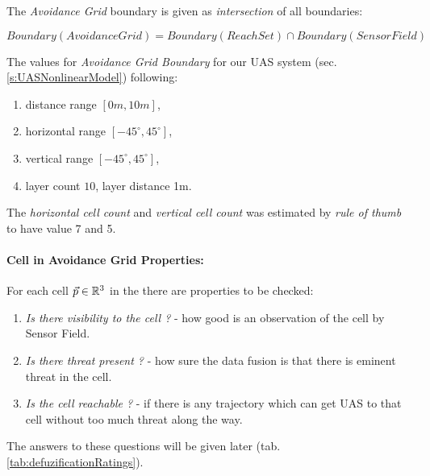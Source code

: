 \noindent The \emph{Avoidance Grid} boundary is given as \emph{intersection} of all boundaries:

\begin{equation}
    Boundary(Avoidance Grid) =  Boundary(Reach Set) \cap Boundary(Sensor Field)
\end{equation}

\noindent The values for \emph{Avoidance Grid Boundary} for our UAS system (sec. \ref{s:UASNonlinearModel}) following:
\begin{enumerate}
    \item distance range $[0m,10m]$,
    \item horizontal range $[-45^\circ,45^\circ]$,
    \item vertical range $[-45^\circ,45^\circ]$,
    \item layer count $10$, layer distance 1m.
\end{enumerate}

The \emph{horizontal cell count} and \emph{vertical cell count} was estimated by \emph{rule of thumb} to have value 7 and 5.

\paragraph{Cell in Avoidance Grid Properties:}\noindent For each cell $\vec{p}\in\mathbb{R}^3$ in the there are properties to be checked:

\begin{enumerate}
    \item \emph{Is there visibility to the cell ?} - how good is an observation of the cell by Sensor Field.
    
    \item \emph{Is there threat present ?} - how sure the data fusion is that there is eminent threat in the cell.
    
    \item \emph{Is the cell reachable ?} - if there is any trajectory which can get UAS to that cell without too much threat along the way.
\end{enumerate}

\noindent The answers to these questions will be given later (tab. \ref{tab:defuzificationRatings}).
